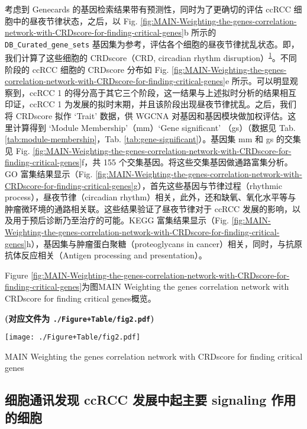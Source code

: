 \documentclass[
]{article}
\begin{document}
考虑到 Genecards 的基因检索结果带有预测性，同时为了更确切的评估 ccRCC 细胞中的昼夜节律状态，之后，以 Fig. \ref{fig:MAIN-Weighting-the-genes-correlation-network-with-CRDscore-for-finding-critical-genes}b 所示的 \texttt{DB\_Curated\_gene\_sets} 基因集为参考，评估各个细胞的昼夜节律扰乱状态。即，我们计算了这些细胞的 CRDscore（CRD, circadian rhythm disruption）\textsuperscript{\protect\hyperlink{ref-SingleCellTraHeLe2022}{1}}。不同阶段的 ccRCC 细胞的 CRDscore 分布如 Fig. \ref{fig:MAIN-Weighting-the-genes-correlation-network-with-CRDscore-for-finding-critical-genes}e 所示。可以明显观察到，ccRCC 1 的得分高于其它三个阶段，这一结果与上述拟时分析的结果相互印证，ccRCC 1 为发展的拟时末期，并且该阶段出现昼夜节律扰乱。之后，我们将 CRDscore 拟作 `Trait' 数据，供 WGCNA 对基因和基因模块做加权评估。这里计算得到 `Module Membership'（mm）`Gene significant' （gs）（数据见 Tab. \ref{tab:module-membership}，Tab. \ref{tab:gene-significant}）。基因集 mm 和 gs 的交集见 Fig. \ref{fig:MAIN-Weighting-the-genes-correlation-network-with-CRDscore-for-finding-critical-genes}f，共 155 个交集基因。将这些交集基因做通路富集分析。GO 富集结果显示（Fig. \ref{fig:MAIN-Weighting-the-genes-correlation-network-with-CRDscore-for-finding-critical-genes}g），首先这些基因与节律过程（rhythmic process），昼夜节律（circadian rhythm）相关，此外，还和缺氧、氧化水平等与肿瘤微环境的通路相关联。这些结果验证了昼夜节律对于 ccRCC 发展的影响，以及用于预后诊断乃至治疗的可能。KEGG 富集结果显示（Fig. \ref{fig:MAIN-Weighting-the-genes-correlation-network-with-CRDscore-for-finding-critical-genes}h），基因集与肿瘤蛋白聚糖（proteoglycans in cancer）相关，同时，与抗原抗体反应相关（Antigen processing and presentation）。

Figure \ref{fig:MAIN-Weighting-the-genes-correlation-network-with-CRDscore-for-finding-critical-genes}为图MAIN Weighting the genes correlation network with CRDscore for finding critical genes概览。

\textbf{(对应文件为 \texttt{./Figure+Table/fig2.pdf})}

\def\@captype{figure}
\begin{center}
\texttt{[image: ./Figure+Table/fig2.pdf]}
\caption{MAIN Weighting the genes correlation network with CRDscore for finding critical genes}\label{fig:MAIN-Weighting-the-genes-correlation-network-with-CRDscore-for-finding-critical-genes}
\end{center}

\hypertarget{comm}{%
\subsection{细胞通讯发现 ccRCC 发展中起主要 signaling 作用的细胞}\label{comm}}
\end{document}
